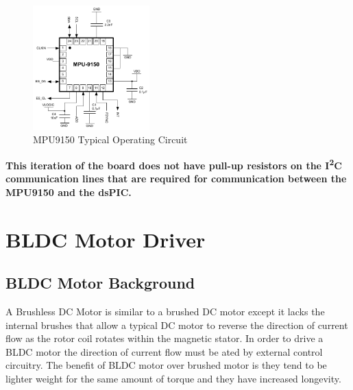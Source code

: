 \documentclass{article}
\begin{document}
\begin{figure}[h!]
	\centering
	\includegraphics[width=0.4\textwidth]{mpu9150}
	\caption{MPU9150 Typical Operating Circuit}
	\label{mpu9150}
\end{figure}

\textbf{This iteration of the board does not have pull-up resistors on the I\textsuperscript{2}C communication lines that are required for communication between the MPU9150 and the dsPIC.}


\section{BLDC Motor Driver}
\subsection{BLDC Motor Background}
A Brushless DC Motor is similar to a brushed DC motor except it lacks the internal brushes that allow a typical DC motor to reverse the direction of current flow as the rotor coil rotates within the magnetic stator. In order to drive a BLDC motor the direction of current flow must be  ated by external control circuitry. The benefit of BLDC motor over brushed motor is they tend to be lighter weight for the same amount of torque and they have increased longevity.
\end{document}

